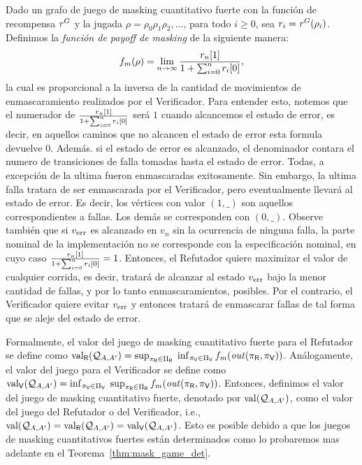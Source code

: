 Dado un grafo de juego de masking cuantitativo fuerte con la función de recompensa $\reward^G$ y la jugada 
$\rho = \rho_0 \rho_1 \rho_2, \ldots$, para todo $i \geq 0$, sea 
$r_i = \reward^G(\rho_i)$.
Definimos la \emph{función de payoff de masking} de la siguiente manera: 
\[%
\FMask(\rho) = \lim_{n \rightarrow \infty}  \frac{\pr{1}{r_n}}{1+ \sum^{n}_{i=0} \pr{0}{r_i}},
\]
la cual es proporcional a la inversa de la cantidad de movimientos de enmascaramiento realizados por el Verificador. Para entender esto, notemos que el numerador de $\frac{\pr{1}{r_n}}{1+ \sum^{n}_{i=0} \pr{0}{r_i}}$ será $1$
cuando alcancemos el estado de error, es decir, en aquellos caminos que no alcancen el estado de error esta formula devuelve $0$. Además. si el estado de error es alcanzado,  el denominador contara el numero de transiciones de falla tomadas hasta el estado de error. Todas, a excepción de la ultima fueron enmascaradas exitosamente. Sin embargo, la ultima falla tratara de ser enmascarada por el Verificador, pero eventualmente llevará al estado de error.
Es decir, los vértices con valor $(1,\_)$ son aquellos correspondientes a fallas. Los demás se corresponden con $(0,\_)$.
Observe también que si $\ErrorSt$ es alcanzado en $v_n$ sin la ocurrencia de ninguna falla, la parte nominal de la implementación no se corresponde con la especificación nominal, en cuyo caso $\frac{\pr{1}{r_n}}{1+ \sum^{n}_{i=0} \pr{0}{r_i}}=1$.
Entonces, el Refutador quiere maximizar el valor de cualquier corrida, es decir, tratará de alcanzar al estado $\ErrorSt$ bajo la menor cantidad de fallas, y por lo tanto enmascaramientos, posibles. 
Por el contrario, el Verificador quiere evitar $\ErrorSt$ y entonces tratará de enmascarar fallas de tal forma que se aleje del estado de error. 

Formalmente, el valor del juego de masking cuantitativo fuerte para el Refutador se define como $\val_\Refuter(\QMStrGame) = \Sup_{\pi_\Refuter \in \Pi_\Refuter} \; \Inf_{\pi_\Verifier \in \Pi_\Verifier} \FMask(\out(\pi_\Refuter, \pi_\Verifier))$. Análogamente, el valor del juego para el Verificador se define como $\val_\Verifier(\QMStrGame) = \Inf_{\pi_\Verifier \in \Pi_\Verifier} \; \Sup_{\pi_\Refuter \in \Pi_\Refuter} \FMask(\out(\pi_\Refuter, 
\pi_\Verifier))$. Entonces, definimos el valor del juego de masking cuantitativo fuerte, denotado por $\val(\QMStrGame)$, como el valor del juego del Refutador o del Verificador, i.e., $\val(\QMStrGame) = \val_\Refuter(\QMStrGame) = \val_\Verifier(\QMStrGame)$. Esto es posible debido a que los juegos de masking cuantitativos fuertes están determinados como lo probaremos mas adelante en el Teorema~\ref{thm:mask_game_det}. \\

